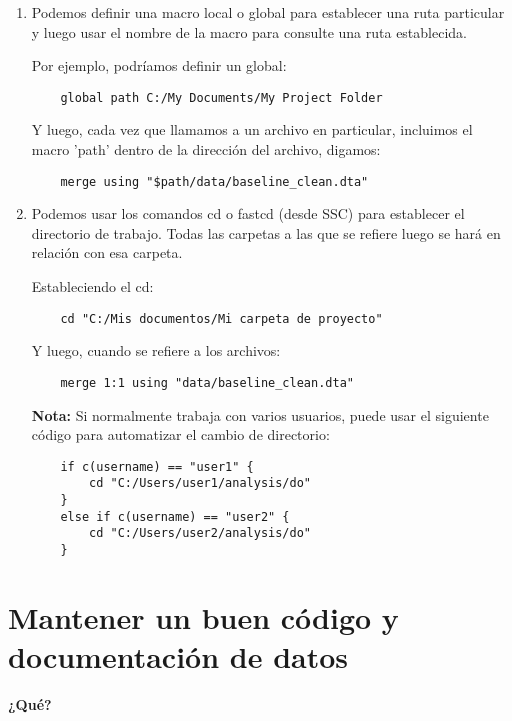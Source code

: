 \documentclass[11pt,en]{elegantpaper}
\begin{document}
\begin{enumerate}
 
\item Podemos definir una macro local o global para establecer una ruta particular y luego usar el nombre de la macro para consulte una ruta establecida.

Por ejemplo, podríamos definir un global:

\begin{lstlisting}
	global path C:/My Documents/My Project Folder
\end{lstlisting}

Y luego, cada vez que llamamos a un archivo en particular, incluimos el macro 'path' dentro de la dirección del archivo, digamos:

\begin{lstlisting}
	merge using "$path/data/baseline_clean.dta"
\end{lstlisting}

\item Podemos usar los comandos cd o fastcd (desde SSC) para establecer el directorio de trabajo. Todas las carpetas a las que se refiere luego se hará en relación con esa carpeta.

Estableciendo el cd:

\begin{lstlisting}
	cd "C:/Mis documentos/Mi carpeta de proyecto"
\end{lstlisting}

Y luego, cuando se refiere a los archivos:

\begin{lstlisting}
	merge 1:1 using "data/baseline_clean.dta"
\end{lstlisting}

\textbf{Nota:} Si normalmente trabaja con varios usuarios, puede usar el siguiente código para automatizar el cambio de directorio:

\begin{lstlisting}
	if c(username) == "user1" {
		cd "C:/Users/user1/analysis/do"
	}
	else if c(username) == "user2" {
		cd "C:/Users/user2/analysis/do"
	}
\end{lstlisting}

\end{enumerate}

\newpage 
\section{Mantener un buen código y documentación de datos}
\label{sec:documentacion}
\noindent
\textbf{¿Qué?}
\end{document}
